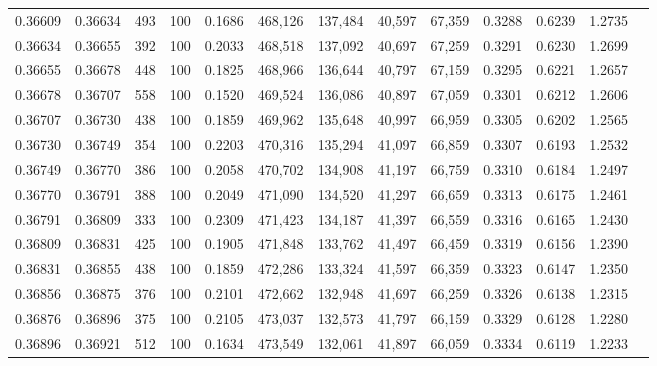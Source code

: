 \begin{tabular}{rrrrrrrrrrrrr}
0.36609 & 0.36634 &    493 & 100 &                                     0.1686 & 468,126 & 137,484 &  40,597 &  67,359 & 0.3288 & 0.6239 & 1.2735 \\
0.36634 & 0.36655 &    392 & 100 &                                     0.2033 & 468,518 & 137,092 &  40,697 &  67,259 & 0.3291 & 0.6230 & 1.2699 \\
0.36655 & 0.36678 &    448 & 100 &                                     0.1825 & 468,966 & 136,644 &  40,797 &  67,159 & 0.3295 & 0.6221 & 1.2657 \\
0.36678 & 0.36707 &    558 & 100 &                                     0.1520 & 469,524 & 136,086 &  40,897 &  67,059 & 0.3301 & 0.6212 & 1.2606 \\
0.36707 & 0.36730 &    438 & 100 &                                     0.1859 & 469,962 & 135,648 &  40,997 &  66,959 & 0.3305 & 0.6202 & 1.2565 \\
0.36730 & 0.36749 &    354 & 100 &                                     0.2203 & 470,316 & 135,294 &  41,097 &  66,859 & 0.3307 & 0.6193 & 1.2532 \\
0.36749 & 0.36770 &    386 & 100 &                                     0.2058 & 470,702 & 134,908 &  41,197 &  66,759 & 0.3310 & 0.6184 & 1.2497 \\
0.36770 & 0.36791 &    388 & 100 &                                     0.2049 & 471,090 & 134,520 &  41,297 &  66,659 & 0.3313 & 0.6175 & 1.2461 \\
0.36791 & 0.36809 &    333 & 100 &                                     0.2309 & 471,423 & 134,187 &  41,397 &  66,559 & 0.3316 & 0.6165 & 1.2430 \\
0.36809 & 0.36831 &    425 & 100 &                                     0.1905 & 471,848 & 133,762 &  41,497 &  66,459 & 0.3319 & 0.6156 & 1.2390 \\
0.36831 & 0.36855 &    438 & 100 &                                     0.1859 & 472,286 & 133,324 &  41,597 &  66,359 & 0.3323 & 0.6147 & 1.2350 \\
0.36856 & 0.36875 &    376 & 100 &                                     0.2101 & 472,662 & 132,948 &  41,697 &  66,259 & 0.3326 & 0.6138 & 1.2315 \\
0.36876 & 0.36896 &    375 & 100 &                                     0.2105 & 473,037 & 132,573 &  41,797 &  66,159 & 0.3329 & 0.6128 & 1.2280 \\
0.36896 & 0.36921 &    512 & 100 &                                     0.1634 & 473,549 & 132,061 &  41,897 &  66,059 & 0.3334 & 0.6119 & 1.2233 \\

\end{tabular}

